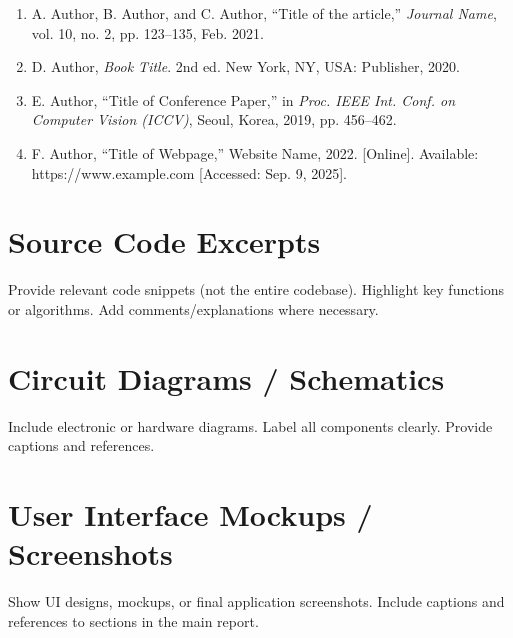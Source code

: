 \documentclass[12pt]{article}
\begin{document}
\begin{enumerate}
    \item A. Author, B. Author, and C. Author, ``Title of the article,'' \textit{Journal Name}, vol. 10, no. 2, pp. 123--135, Feb. 2021.
    \item D. Author, \textit{Book Title}. 2nd ed. New York, NY, USA: Publisher, 2020.
    \item E. Author, ``Title of Conference Paper,'' in \textit{Proc. IEEE Int. Conf. on Computer Vision (ICCV)}, Seoul, Korea, 2019, pp. 456--462.
    \item F. Author, ``Title of Webpage,'' Website Name, 2022. [Online]. Available: https://www.example.com [Accessed: Sep. 9, 2025].
\end{enumerate}


\newpage
\appendix

\section{Source Code Excerpts}
Provide relevant code snippets (not the entire codebase). Highlight key functions or algorithms. Add comments/explanations where necessary.

\section{Circuit Diagrams / Schematics}
Include electronic or hardware diagrams. Label all components clearly. Provide captions and references.

\section{User Interface Mockups / Screenshots}
Show UI designs, mockups, or final application screenshots. Include captions and references to sections in the main report.
\end{document}
